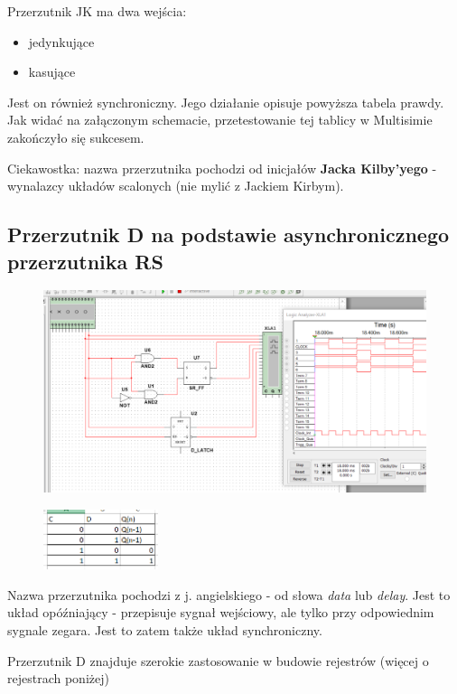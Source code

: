 \documentclass[12pt,a4paper]{article}
\begin{document}
Przerzutnik JK ma dwa wejścia:
\begin{itemize}
\item jedynkujące
\item kasujące
\end{itemize}

Jest on również synchroniczny. Jego działanie opisuje  powyższa tabela prawdy. Jak widać na załączonym schemacie, przetestowanie tej tablicy w Multisimie zakończyło się sukcesem.


Ciekawostka: nazwa przerzutnika pochodzi od inicjałów  \textbf{Jacka Kilby'yego} - wynalazcy układów scalonych (nie mylić z Jackiem Kirbym).


\subsection{Przerzutnik D na podstawie asynchronicznego przerzutnika RS}
\begin{figure}[H]
\centering
\includegraphics[width=\textwidth]{img/3d}
\end{figure}
\begin{figure}[H]
\centering
\includegraphics[width=0.3\textwidth]{img/3dTruthTable}
\end{figure}

Nazwa przerzutnika pochodzi z j. angielskiego - od słowa \textit{data} lub \textit{delay}. Jest to układ opóźniający - przepisuje sygnał wejściowy, ale tylko przy odpowiednim sygnale zegara. Jest to zatem także układ synchroniczny.

Przerzutnik D znajduje szerokie zastosowanie w budowie rejestrów (więcej o rejestrach poniżej)
\end{document}
